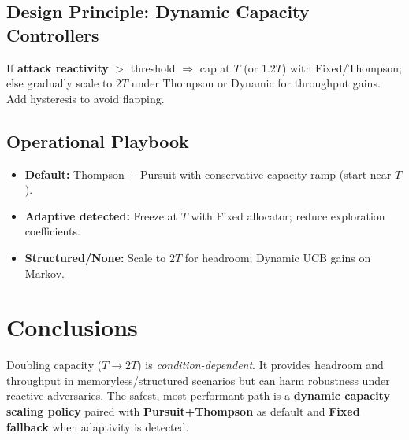 \documentclass[11pt,a4paper]{article}
\begin{document}
\subsection{Design Principle: Dynamic Capacity Controllers}
\begin{tcolorbox}[colback=highlightcolor,title=Controller Policy Sketch]
\small
If \textbf{attack reactivity} $>$ threshold $\Rightarrow$ cap at $T$ (or $1.2T$) with Fixed/Thompson; else gradually scale to $2T$ under Thompson or Dynamic for throughput gains. Add hysteresis to avoid flapping.
\end{tcolorbox}

\subsection{Operational Playbook}
\begin{itemize}
    \item \textbf{Default:} Thompson + Pursuit with conservative capacity ramp (start near $T$).
    \item \textbf{Adaptive detected:} Freeze at $T$ with Fixed allocator; reduce exploration coefficients.
    \item \textbf{Structured/None:} Scale to $2T$ for headroom; Dynamic UCB gains on Markov.
\end{itemize}

\section{Conclusions}

Doubling capacity ($T \rightarrow 2T$) is \emph{condition-dependent}. It provides headroom and throughput in memoryless/structured scenarios but can harm robustness under reactive adversaries. The safest, most performant path is a \textbf{dynamic capacity scaling policy} paired with \textbf{Pursuit+Thompson} as default and \textbf{Fixed fallback} when adaptivity is detected.

\begin{center}
\end{center}


\end{document}
